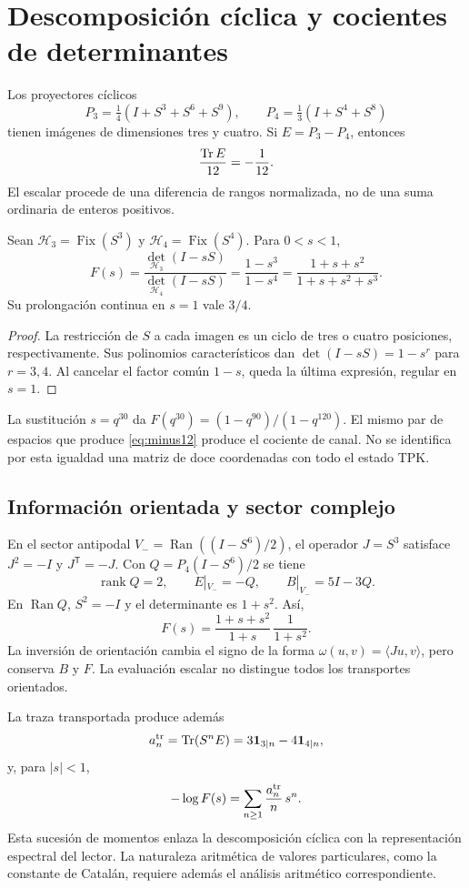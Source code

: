 \section{Descomposición cíclica y cocientes de determinantes}
Los proyectores cíclicos
\[
P_3=\tfrac14(I+S^3+S^6+S^9),\qquad
P_4=\tfrac13(I+S^4+S^8)
\]
tienen imágenes de dimensiones tres y cuatro. Si $E=P_3-P_4$, entonces
\begin{equation}
\frac{\operatorname{Tr} E}{12}=-\frac1{12}.
\label{eq:minus12}
\end{equation}
El escalar procede de una diferencia de rangos normalizada, no de una
suma ordinaria de enteros positivos.

\begin{theorem}
Sean $\mathcal H_3=\operatorname{Fix}(S^3)$ y
$\mathcal H_4=\operatorname{Fix}(S^4)$. Para $0<s<1$,
\begin{equation}
F(s)=\frac{\det_{\mathcal H_3}(I-sS)}{\det_{\mathcal H_4}(I-sS)}
=\frac{1-s^3}{1-s^4}
=\frac{1+s+s^2}{1+s+s^2+s^3}.
\label{eq:det}
\end{equation}
Su prolongación continua en $s=1$ vale $3/4$.
\end{theorem}
\begin{proof}
La restricción de $S$ a cada imagen es un ciclo de tres o cuatro
posiciones, respectivamente. Sus polinomios característicos dan
$\det(I-sS)=1-s^r$ para $r=3,4$. Al cancelar el factor común $1-s$,
queda la última expresión, regular en $s=1$.
\end{proof}

La sustitución $s=q^{30}$ da
$F(q^{30})=(1-q^{90})/(1-q^{120})$.
El mismo par de espacios que produce \eqref{eq:minus12}
produce el cociente de canal. No se identifica por esta igualdad
una matriz de doce coordenadas con todo el estado TPK.

\subsection{Información orientada y sector complejo}
En el sector antipodal $V_-=\operatorname{Ran}((I-S^6)/2)$,
el operador $J=S^3$ satisface $J^2=-I$ y $J^{\mathsf T}=-J$.
Con $Q=P_4(I-S^6)/2$ se tiene
\[
\operatorname{rank}Q=2,\qquad E|_{V_-}=-Q,\qquad B|_{V_-}=5I-3Q.
\]
En $\operatorname{Ran}Q$, $S^2=-I$ y el determinante es $1+s^2$.
Así,
\[
F(s)=\frac{1+s+s^2}{1+s}\,\frac1{1+s^2}.
\]
La inversión de orientación cambia el signo de la forma
$\omega(u,v)=\langle Ju,v\rangle$, pero conserva $B$ y $F$.
La evaluación escalar no distingue todos los transportes orientados.

La traza transportada produce además
\[
a_n^{\rm tr}=\operatorname{Tr}(S^nE)=3\mathbf1_{3\mid n}-4\mathbf1_{4\mid n},
\]
y, para $|s|<1$,
\[
-\log F(s)=\sum_{n\ge1}\frac{a_n^{\rm tr}}n\,s^n.
\]
Esta sucesión de momentos enlaza la descomposición cíclica con la
representación espectral del lector. La naturaleza aritmética de valores
particulares, como la constante de Catalán, requiere además el análisis
aritmético correspondiente.
